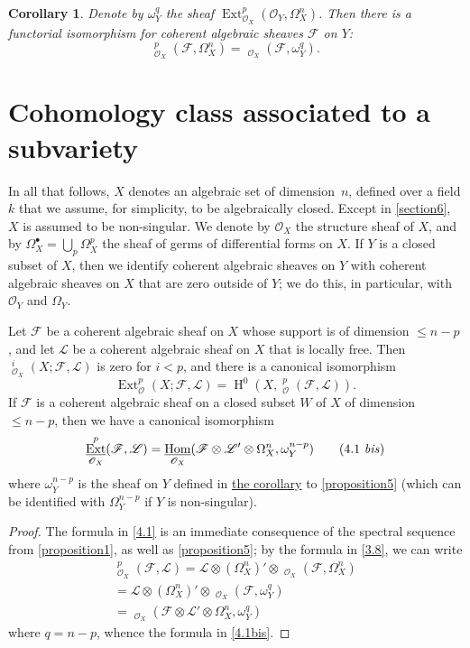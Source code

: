\documentclass{article}
\theoremstyle{plain}
\newenvironment{lemma}[1]
  {\renewcommand\theinnercustomlemma{#1}\innercustomlemma}
  {\endinnercustomlemma}
\newtheorem*{corollary*}{Corollary}
\theoremstyle{definition}
\newcommand{\sh}[1]{{\mathscr{#1}}}
\renewcommand{\leq}{\leqslant}
\DeclareMathOperator{\Ext}{Ext}
\DeclareMathOperator{\shExt}{\underline{Ext}}
\DeclareMathOperator{\shHom}{\underline{Hom}}
\DeclareMathOperator{\HH}{H}
\newcommand{\oldpage}[1]{\marginpar{\footnotesize$\Big\vert$ \textit{p.~#1}}}
\begin{document}
\begin{corollary*}
\label{proposition5corollary}
  Denote by $\omega_Y^q$ the sheaf $\Ext_{\sh{O}_X}^p(\sh{O}_Y,\Omega_X^n)$.
  Then there is a functorial isomorphism for coherent algebraic sheaves $\sh{F}$ on $Y$:
  \[
  \label{3.8}
    \shExt_{\sh{O}_X}^p(\sh{F},\Omega_X^n) = \shHom_{\sh{O}_X}(\sh{F},\omega_Y^q).
  \tag{3.8}
  \]
\end{corollary*}


\section{Cohomology class associated to a subvariety}
\label{section4}

In all that follows, $X$ denotes an algebraic set of dimension~$n$, defined over a field $k$ that we assume, for simplicity, to be algebraically closed.
Except in \cref{section6}, $X$ is assumed to be non-singular.
We denote by $\sh{O}_X$ the structure sheaf of $X$, and by $\Omega_X^\bullet=\bigcup_p\Omega_X^p$ the sheaf of germs of differential forms on $X$.
If $Y$ is a closed subset of $X$, then we identify coherent algebraic sheaves on $Y$ with coherent algebraic sheaves on $X$ that are zero outside of $Y$;
we do this, in particular, with $\sh{O}_Y$ and $\Omega_Y$.

\begin{lemma}{1}
\label{lemma1}
  Let $\sh{F}$ be a coherent algebraic sheaf on $X$ whose support is of dimension $\leq n-p$, and let $\sh{L}$ be a coherent algebraic sheaf on $X$ that is locally free.
  Then $\shExt_{\sh{O}_X}^i(X;\sh{F},\sh{L})$ is zero for $i<p$, and there is a canonical isomorphism
  \[
  \label{4.1}
    \Ext_\sh{O}^p(X;\sh{F},\sh{L}) = \HH^0(X,\shExt_\sh{O}^p(\sh{F},\sh{L})).
  \tag{4.1}
  \]
  If $\sh{F}$ is a coherent algebraic sheaf on a closed subset $W$ of $X$ of dimension $\leq n-p$, then we have a canonical isomorphism
  \[
  \label{4.1bis}
    \shExt_{\sh{O}_X}^p(\sh{F},\sh{L}) = \shHom_{\sh{O}_X}(\sh{F}\otimes\sh{L}'\otimes\Omega_X^n,\omega_Y^{n-p})
  \tag{4.1 \emph{bis}}
  \]
  where $\omega_Y^{n-p}$ is the sheaf on $Y$ defined in \hyperref[proposition5corollary]{the corollary} to \cref{proposition5} (which can be identified with $\Omega_Y^{n-p}$ if $Y$ is non-singular).
\end{lemma}

\begin{proof}
  The formula in \cref{4.1} is an immediate consequence of the spectral sequence from \cref{proposition1}, as well as \cref{proposition5};
  by the formula in \cref{3.8}, we can write
\oldpage{149-10}
  \[
    \begin{gathered}
      \shExt_{\sh{O}_X}^p(\sh{F},\sh{L})
      = \sh{L}\otimes(\Omega_X^n)'\otimes\shExt_{\sh{O}_X}(\sh{F},\Omega_X^n)
    \\= \sh{L}\otimes(\Omega_X^n)'\otimes\shHom_{\sh{O}_X}(\sh{F},\omega_Y^q)
    \\= \shHom_{\sh{O}_X}(\sh{F}\otimes\sh{L}'\otimes\Omega_X^n,\omega_Y^q)
    \end{gathered}
  \]
  where $q=n-p$, whence the formula in \cref{4.1bis}.
\end{proof}
\end{document}
